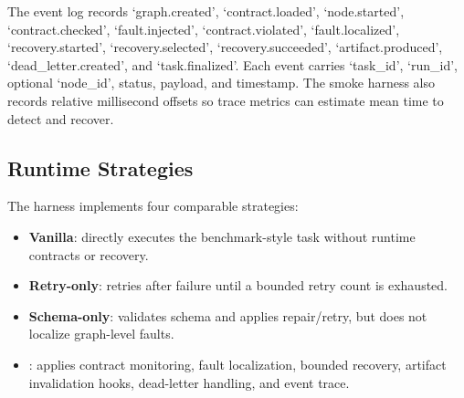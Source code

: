The event log records `graph.created', `contract.loaded', `node.started', `contract.checked', `fault.injected', `contract.violated', `fault.localized', `recovery.started', `recovery.selected', `recovery.succeeded', `artifact.produced', `dead\_letter.created', and `task.finalized'. Each event carries `task\_id', `run\_id', optional `node\_id', status, payload, and timestamp. The smoke harness also records relative millisecond offsets so trace metrics can estimate mean time to detect and recover.

\subsection{Runtime Strategies}

The harness implements four comparable strategies:

\begin{itemize}
    \item \textbf{Vanilla}: directly executes the benchmark-style task without runtime contracts or recovery.
    \item \textbf{Retry-only}: retries after failure until a bounded retry count is exhausted.
    \item \textbf{Schema-only}: validates schema and applies repair/retry, but does not localize graph-level faults.
    \item \textbf{\system}: applies contract monitoring, fault localization, bounded recovery, artifact invalidation hooks, dead-letter handling, and event trace.
\end{itemize}
